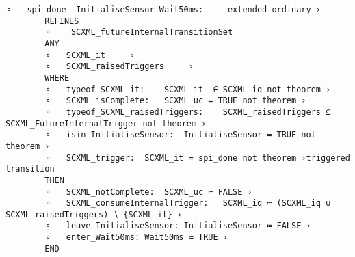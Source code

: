 \begin{lstlisting}[caption={Event-B event corresponding to internal triggered transition to \textbf{Wait50ms} state. This is the refinement level 1 shown in~\ref{fig:ASIC}}, label={lst:BasisMachine},language=Event-B, escapechar=|]
	⚬	spi_done__InitialiseSensor_Wait50ms:	 extended ordinary ›
		REFINES
		⚬	 SCXML_futureInternalTransitionSet 
		ANY
		⚬	SCXML_it	 ›
		⚬	SCXML_raisedTriggers	 ›
		WHERE
		⚬	typeof_SCXML_it:	SCXML_it  ∈ SCXML_iq not theorem ›
		⚬	SCXML_isComplete:	SCXML_uc = TRUE not theorem ›
		⚬	typeof_SCXML_raisedTriggers:	SCXML_raisedTriggers ⊆ SCXML_FutureInternalTrigger not theorem ›
		⚬	isin_InitialiseSensor:	InitialiseSensor = TRUE not theorem ›
		⚬	SCXML_trigger:	SCXML_it = spi_done not theorem ›triggered transition
		THEN
		⚬	SCXML_notComplete:	SCXML_uc ≔ FALSE ›
		⚬	SCXML_consumeInternalTrigger:	SCXML_iq ≔ (SCXML_iq ∪ SCXML_raisedTriggers) ∖ {SCXML_it} ›
		⚬	leave_InitialiseSensor:	InitialiseSensor ≔ FALSE ›
		⚬	enter_Wait50ms:	Wait50ms ≔ TRUE ›
		END
\end{lstlisting}